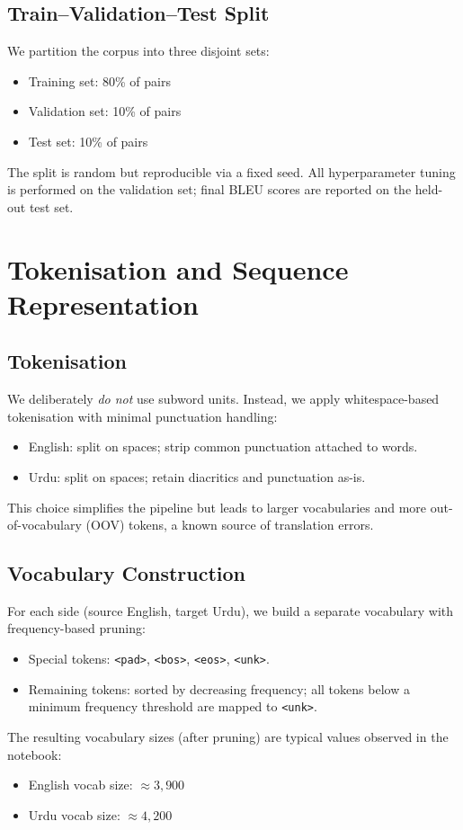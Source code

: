 \documentclass[runningheads]{llncs}
\begin{document}
\subsection{Train--Validation--Test Split}
We partition the corpus into three disjoint sets:
\begin{itemize}
    \item Training set: 80\% of pairs
    \item Validation set: 10\% of pairs
    \item Test set: 10\% of pairs
\end{itemize}
The split is random but reproducible via a fixed seed.
All hyperparameter tuning is performed on the validation set; final BLEU scores are reported on the held-out test set.

\section{Tokenisation and Sequence Representation}
\subsection{Tokenisation}
We deliberately \emph{do not} use subword units.
Instead, we apply whitespace-based tokenisation with minimal punctuation handling:
\begin{itemize}
    \item English: split on spaces; strip common punctuation attached to words.
    \item Urdu: split on spaces; retain diacritics and punctuation as-is.
\end{itemize}
This choice simplifies the pipeline but leads to larger vocabularies and more out-of-vocabulary (OOV) tokens, a known source of translation errors.

\subsection{Vocabulary Construction}
For each side (source English, target Urdu), we build a separate vocabulary with frequency-based pruning:
\begin{itemize}
    \item Special tokens: \texttt{\textless pad\textgreater}, \texttt{\textless bos\textgreater}, \texttt{\textless eos\textgreater}, \texttt{\textless unk\textgreater}.
    \item Remaining tokens: sorted by decreasing frequency; all tokens below a minimum frequency threshold are mapped to \texttt{\textless unk\textgreater}.
\end{itemize}
The resulting vocabulary sizes (after pruning) are typical values observed in the notebook:
\begin{itemize}
    \item English vocab size: \(\approx 3{,}900\)
    \item Urdu vocab size: \(\approx 4{,}200\)
\end{itemize}
\end{document}

